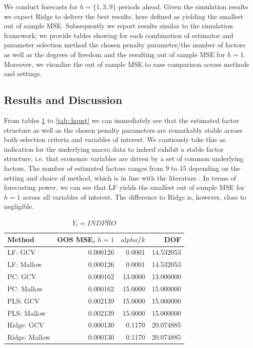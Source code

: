 We conduct forecasts for $h = \{1, 3, 9\}$ periods ahead. Given the simulation results we expect Ridge to deliver the best results, here defined as yielding the smallest out of sample MSE. Subsequently we report results similar to the simulation framework; we provide tables showing for each combination of estimator and parameter selection method the chosen penalty parameter/the number of factors as well as the degrees of freedom and the resulting out of sample MSE for $h=1$. Moreover, we visualize the out of sample MSE to ease comparison across methods and settings.

\subsection{Results and Discussion}
From tables \ref{tab::indpro} to \ref{tab::houst} we can immediately see that the estimated factor structure as well as the chosen penalty parameters are remarkably stable across both selection criteria and variables of interest. We cautiously take this as indication for the underlying macro data to indeed exhibit a stable factor structure, i.e. that economic variables are driven by a set of common underlying factors. \citeauthor{} The number of estimated factors ranges from 9 to 15 depending on the setting and choice of method, which is in line with the literature \citeauthor{}.
In terms of forecasting power, we can see that LF yields the smallest out of sample MSE for $h=1$ across all variables of interest. The difference to Ridge is, however, close to negligible. 

\begin{table}[h!]
\centering
\caption{$Y_t = INDPRO$}
\label{tab::indpro}
	\begin{tabular}{lrrr}
\toprule
       Method &  OOS MSE, $h =1$ &  $alpha$/$k$ &  DOF \\
\midrule
      LF: GCV & 0.000126 &   0.0001 & 14.532053 \\
   LF: Mallow & 0.000126 &   0.0001 & 14.532053 \\
      PC: GCV & 0.000162 &  13.0000 & 13.000000 \\
   PC: Mallow & 0.000162 &  15.0000 & 15.000000 \\
     PLS: GCV & 0.002139 &  15.0000 & 15.000000 \\
  PLS: Mallow & 0.002139 &  15.0000 & 15.000000 \\
   Ridge: GCV & 0.000130 &   0.1170 & 20.074885 \\
Ridge: Mallow & 0.000130 &   0.1170 & 20.074885 \\
\bottomrule
\end{tabular}
\end{table}

